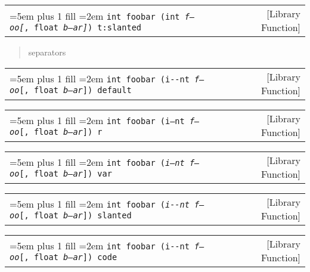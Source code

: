 \documentclass{book}
\newcommand\GNUTexinfocommandstyletextvar[1]{{\normalfont{}\textsl{#1}}}%
\begin{document}
%

\noindent\begin{tabularx}{\linewidth}{@{}Xr}
\rightskip=5em plus 1 fill
\hangindent=2em
\texttt{int foobar (int\ \GNUTexinfocommandstyletextvar{f---oo}\texttt{\textsl{[}},\ float\ \GNUTexinfocommandstyletextvar{b--ar}\texttt{\textsl{]}})\ t:slanted}& [Library Function]
\end{tabularx}

%
\begin{quote}
\unskip{\parskip=0pt\noindent}%
separators
\end{quote}


\noindent\begin{tabularx}{\linewidth}{@{}Xr}
\rightskip=5em plus 1 fill
\hangindent=2em
\texttt{int foobar (i{-}{-}nt\ \GNUTexinfocommandstyletextvar{f---oo}[,\ float\ \GNUTexinfocommandstyletextvar{b--ar}])\ default}& [Library Function]
\end{tabularx}

%

\noindent\begin{tabularx}{\linewidth}{@{}Xr}
\rightskip=5em plus 1 fill
\hangindent=2em
\texttt{int foobar (\textnormal{i--nt}\ \GNUTexinfocommandstyletextvar{f---oo}[,\ float\ \GNUTexinfocommandstyletextvar{b--ar}])\ r}& [Library Function]
\end{tabularx}

%

\noindent\begin{tabularx}{\linewidth}{@{}Xr}
\rightskip=5em plus 1 fill
\hangindent=2em
\texttt{int foobar (\GNUTexinfocommandstyletextvar{i--nt}\ \GNUTexinfocommandstyletextvar{f---oo}[,\ float\ \GNUTexinfocommandstyletextvar{b--ar}])\ var}& [Library Function]
\end{tabularx}

%

\noindent\begin{tabularx}{\linewidth}{@{}Xr}
\rightskip=5em plus 1 fill
\hangindent=2em
\texttt{int foobar (\textsl{i{-}{-}nt}\ \GNUTexinfocommandstyletextvar{f---oo}[,\ float\ \GNUTexinfocommandstyletextvar{b--ar}])\ slanted}& [Library Function]
\end{tabularx}

%

\noindent\begin{tabularx}{\linewidth}{@{}Xr}
\rightskip=5em plus 1 fill
\hangindent=2em
\texttt{int foobar (\texttt{i{-}{-}nt}\ \GNUTexinfocommandstyletextvar{f---oo}[,\ float\ \GNUTexinfocommandstyletextvar{b--ar}])\ code}& [Library Function]
\end{tabularx}
\end{document}
